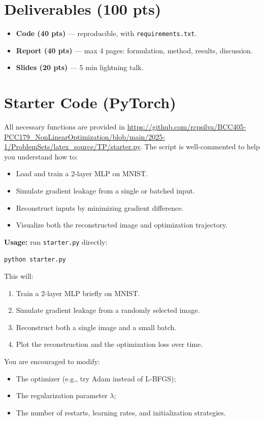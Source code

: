 \documentclass[12pt]{article}
\begin{document}
\section*{Deliverables (100 pts)}
\begin{itemize}[nosep]
  \item \textbf{Code (40 pts)} — reproducible, with \texttt{requirements.txt}.
  \item \textbf{Report (40 pts)} — max 4 pages: formulation, method, results, discussion.
  \item \textbf{Slides (20 pts)} — 5 min lightning talk.
\end{itemize}

\section*{Starter Code (PyTorch)}
All necessary functions are provided in \url{https://github.com/rcpsilva/BCC405-PCC179_NonLinearOptimization/blob/main/2025-1/ProblemSets/latex_source/TP/starter.py}. The script is well-commented to help you understand how to:

\begin{itemize}[nosep]
  \item Load and train a 2-layer MLP on MNIST.
  \item Simulate gradient leakage from a single or batched input.
  \item Reconstruct inputs by minimizing gradient difference.
  \item Visualize both the reconstructed image and optimization trajectory.
\end{itemize}

\textbf{Usage:} run \texttt{starter.py} directly:
\begin{lstlisting}[language=bash]
python starter.py
\end{lstlisting}

This will:
\begin{enumerate}[nosep]
  \item Train a 2-layer MLP briefly on MNIST.
  \item Simulate gradient leakage from a randomly selected image.
  \item Reconstruct both a single image and a small batch.
  \item Plot the reconstruction and the optimization loss over time.
\end{enumerate}

You are encouraged to modify:
\begin{itemize}[nosep]
  \item The optimizer (e.g., try Adam instead of L-BFGS);
  \item The regularization parameter \(\lambda\);
  \item The number of restarts, learning rates, and initialization strategies.
\end{itemize}
\end{document}
